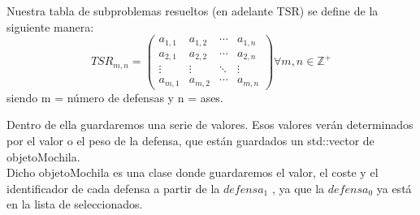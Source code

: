 Nuestra tabla de subproblemas resueltos (en adelante TSR) se define de la siguiente manera: \\
\begin{equation*}
    TSR_{m,n} = 
    \begin{pmatrix}
    a_{1,1} & a_{1,2} & \cdots & a_{1,n} \\
    a_{2,1} & a_{2,2} & \cdots & a_{2,n} \\
    \vdots  & \vdots  & \ddots & \vdots  \\
    a_{m,1} & a_{m,2} & \cdots & a_{m,n} 
    \end{pmatrix}
\forall m,n \in \mathbb{Z^+}
\end{equation*}
siendo m = número de defensas y n = ases. \newline

Dentro de ella guardaremos una serie de valores. Esos valores verán determinados por el valor o el peso de la defensa, que están guardados un std::vector de objetoMochila.\\
Dicho objetoMochila es una clase donde guardaremos el valor, el coste y el identificador de cada defensa a partir de la $defensa_{1}$ , ya que la $defensa_{0}$ ya está en la lista de seleccionados.